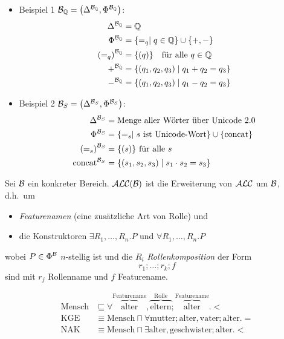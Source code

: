\begin{tafel}\mbox{}
    \begin{itemize}
        \item Beispiel 1 $\MB_\Q = \left( \Delta^{\MB_\Q}, \Phi^{\MB_\Q} \right)$: 
            \begin{align*}
                \Delta^{\mathcal{B}_{\mathbb{Q}}} &= \mathbb{Q}\\
                \Phi^{\mathcal{B}_{\mathbb{Q}}} &= \{ =_q \mid q \in \mathbb{Q} \} \cup \{+, -\}\\
                {(=_q)}^{\mathcal{B}_{\mathbb{Q}}} &= \{(q)\} \quad \text{für alle } q \in \mathbb{Q}\\
                +^{\mathcal{B}_{\mathbb{Q}}} &= \{(q_1, q_2, q_3) \mid q_1 + q_2 = q_3\}\\
                -^{\mathcal{B}_{\mathbb{Q}}} &= \{(q_1, q_2, q_3) \mid q_1 - q_2 = q_3\}
            \end{align*}
        \item Beispiel 2 $\MB_S = \left( \Delta^{\MB_S}, \Phi^{\MB_S} \right)$: 
            \begin{align*}
                \Delta^{\mathcal{B}_S} &= \text{Menge aller Wörter über Unicode 2.0}\\
                \Phi^{\mathcal{B}_S} &= \{ =_s \mid s\ \text{ist Unicode-Wort}\} \cup \{\text{concat}\}\\
                {(=_s)}^{\mathcal{B}_S} &= \{(s)\}\ \text{für alle}\ s\\
                \text{concat}^{\mathcal{B}_S} &= \{(s_1, s_2, s_3) \mid s_1 \cdot s_2 = s_3\}
            \end{align*}
    \end{itemize}
\end{tafel}


\begin{definition}
    Sei $\mathcal{B}$ ein konkreter Bereich. $\mathcal{A}\mathcal{L}\mathcal{C}(\mathcal{B})$ ist die Erweiterung von $\mathcal{A}\mathcal{L}\mathcal{C}$ um $\mathcal{B}$, d.h.\ um
    \begin{itemize}
\item \emph{Featurenamen} (eine zusätzliche Art von Rolle) und
\item die Konstruktoren $\exists R_1, \ldots, R_n.P$ und
  $\forall R_1,\ldots,R_n.P$
\end{itemize}
wobei $P \in \Phi^{\mathcal{B}}$ $n$-stellig ist und die $R_i$
\emph{Rollenkomposition} der Form $$r_1;\ldots;r_{k};f$$ sind mit
$r_{j}$ Rollenname und $f$ Featurename.
\end{definition}

\begin{tafel}
    \begin{align*}
        \text{Mensch} &\sqsubseteq \forall \overbrace{\text{alter}}^\text{Featurename},\overbrace{\text{eltern}}^\text{Rolle};\overbrace{\text{alter}}^\text{Featurename}.<\\
        \text{KGE} &\equiv \text{Mensch} \sqcap \forall \text{mutter};\text{alter},\text{vater};\text{alter}.=\\
        \text{NAK} &\equiv \text{Mensch} \sqcap \exists \text{alter}, \text{geschwister};\text{alter}.<
    \end{align*}
\end{tafel}

